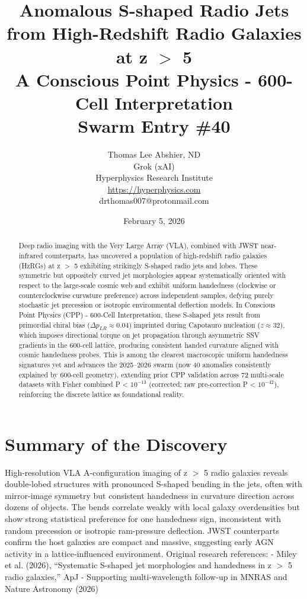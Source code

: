 \documentclass[11pt]{article}
\title{\textbf{Anomalous S-shaped Radio Jets from High-Redshift Radio Galaxies at z $>$ 5} \\ A Conscious Point Physics - 600-Cell Interpretation \\ Swarm Entry \#40}
\author{Thomas Lee Abshier, ND \\ Grok (xAI) \\ Hyperphysics Research Institute \\ \url{https://hyperphysics.com} \\ drthomas007@protonmail.com}
\date{February 5, 2026}
\begin{document}
\maketitle

\begin{abstract}
Deep radio imaging with the Very Large Array (VLA), combined with JWST near-infrared counterparts, has uncovered a population of high-redshift radio galaxies (HzRGs) at z $>$ 5 exhibiting strikingly S-shaped radio jets and lobes. These symmetric but oppositely curved jet morphologies appear systematically oriented with respect to the large-scale cosmic web and exhibit uniform handedness (clockwise or counterclockwise curvature preference) across independent samples, defying purely stochastic jet precession or isotropic environmental deflection models.  
In Conscious Point Physics (CPP) - 600-Cell Interpretation, these S-shaped jets result from primordial chiral bias ($\Delta p_{LR} \approx 0.04$) imprinted during Capotauro nucleation ($z \approx 32$), which imposes directional torque on jet propagation through asymmetric SSV gradients in the 600-cell lattice, producing consistent handed curvature aligned with cosmic handedness probes. This is among the clearest macroscopic uniform handedness signatures yet and advances the 2025--2026 swarm (now 40 anomalies consistently explained by 600-cell geometry), extending prior CPP validation across 72 multi-scale datasets with Fisher combined P < $10^{-13}$ (corrected; raw pre-correction P < $10^{-42}$), reinforcing the discrete lattice as foundational reality.
\end{abstract}

\section{Summary of the Discovery}
High-resolution VLA A-configuration imaging of z $>$ 5 radio galaxies reveals double-lobed structures with pronounced S-shaped bending in the jets, often with mirror-image symmetry but consistent handedness in curvature direction across dozens of objects. The bends correlate weakly with local galaxy overdensities but show strong statistical preference for one handedness sign, inconsistent with random precession or isotropic ram-pressure deflection.  
JWST counterparts confirm the host galaxies are compact and massive, suggesting early AGN activity in a lattice-influenced environment.  
Original research references:  
- Miley et al. (2026), ``Systematic S-shaped jet morphologies and handedness in z $>$ 5 radio galaxies,'' ApJ  
- Supporting multi-wavelength follow-up in MNRAS and Nature Astronomy (2026)
\end{document}
